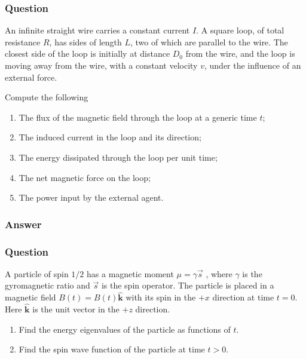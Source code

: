 \subsubsection{Question}
An infinite straight wire carries a constant current $I$. A square loop, of total resistance $R$, has sides of length $L$, two of which are parallel to the wire. The closest side of the loop is initially at distance $D_0$ from the wire, and the loop is moving away from the wire, with a constant velocity $v$, under the influence of an external force.

Compute the following
\begin{enumerate}
	\item The flux of the magnetic field through the loop at a generic time $t$;
	\item The induced current in the loop and its direction;
	\item The energy dissipated through the loop per unit time;
	\item The net magnetic force on the loop;
	\item The power input by the external agent.
\end{enumerate}
\subsubsection{Answer}



\subsubsection{Question}
A particle of spin $1/2$ has a magnetic moment ${\mu} = {\gamma} \vec{s}$ , where ${\gamma}$ is the gyromagnetic ratio and $\vec{s}$ is the spin operator. The particle is placed in a magnetic field $B(t) = B(t)\hat{\boldsymbol{k}}$ with its spin in the $+x$ direction at time $t = 0$. Here $\hat{\boldsymbol{k}}$ is the unit vector in the $+z$ direction.
\begin{enumerate}
	\item Find the energy eigenvalues of the particle as functions of $t$.
	\item Find the spin wave function of the particle at time $t > 0$.
\end{enumerate}

